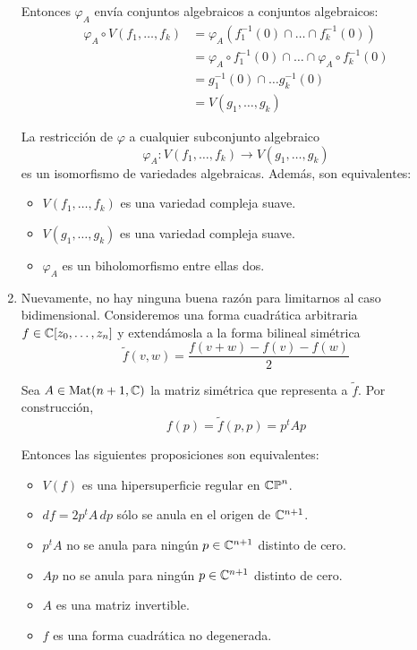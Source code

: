 \begin{solution}
\begin{enumerate}[label=\alph*)]
    Entonces $\varphi_A$ envía conjuntos algebraicos a conjuntos algebraicos:
    \begin{align*}
    \varphi_A \circ V(f_1, \dots, f_k)
        & = \varphi_A(f_1^{-1}(0) \cap \dots \cap f_k^{-1}(0)) \\
        & = \varphi_A \circ f_1^{-1}(0) \cap \dots \cap \varphi_A \circ f_k^{-1}(0) \\
        & = g_1^{-1}(0) \cap \dots g_k^{-1}(0) \\
        & = V(g_1, \dots, g_k)
    \end{align*}
    
    La restricción de $\varphi$ a cualquier subconjunto algebraico
    $$\varphi_A : V(f_1, \dots, f_k) \to V(g_1, \dots, g_k)$$
    es un isomorfismo de variedades algebraicas. Además, son equivalentes:
    \begin{itemize}
        \item $V(f_1, \dots, f_k)$ es una variedad compleja suave.
        \item $V(g_1, \dots, g_k)$ es una variedad compleja suave.
        \item $\varphi_A$ es un biholomorfismo entre ellas dos.
    \end{itemize}
    
    \item Nuevamente, no hay ninguna buena razón para limitarnos al caso bidimensional. Consideremos una forma cuadrática arbitraria $f \in \mathbb C[z_0, \dots, z_n]$ y extendámosla a la forma bilineal simétrica
    $$\tilde f(v, w) = \frac {f(v + w) - f(v) - f(w)} 2$$
    
    Sea $A \in \operatorname{Mat}(n+1, \mathbb C)$ la matriz simétrica que representa a $\tilde f$. Por construcción,
    $$f(p) = \tilde f(p, p) = p^t Ap$$
    
    Entonces las siguientes proposiciones son equivalentes:
    \begin{itemize}
        \item $V(f)$ es una hipersuperficie regular en $\mathbb {CP}^n$.
        \item $df = 2 p^t A \, dp$ sólo se anula en el origen de $\mathbb C^{n+1}$.
        \item $p^t A$ no se anula para ningún $p \in \mathbb C^{n+1}$ distinto de cero.
        \item $Ap$ no se anula para ningún $p \in \mathbb C^{n+1}$ distinto de cero.
        \item $A$ es una matriz invertible.
        \item $f$ es una forma cuadrática no degenerada.
    \end{itemize} 
\end{enumerate}
\end{solution}
